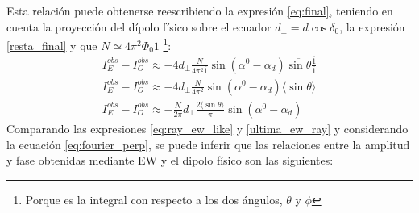 Esta relación puede obtenerse reescribiendo la expresión \ref{eq:final}, teniendo en cuenta la proyección del dípolo físico sobre el ecuador $d_{\perp}= d\cos\delta_0$, la expresión  \ref{resta_final} y que $N \simeq 4\pi^2 \Phi_0 \overline{1} $ \footnote{Porque es la integral con respecto a los dos ángulos, $\theta$ y $\phi$}:
\begin{align}
    I^{obs}_E -  I^{obs}_O \approx -4 d_\perp \frac{N}{ 4\pi^2\overline{1}} \sin(\alpha^0  - \alpha_d)\overline{\sin\theta} \frac{\overline{1}}{\overline{1}}\\
    I^{obs}_E -  I^{obs}_O \approx -4 d_\perp \frac{N}{ 4\pi^2} \sin(\alpha^0  - \alpha_d)\langle\sin\theta \rangle\\
    I^{obs}_E -  I^{obs}_O \approx -\frac{N}{2\pi} d_\perp \frac{2\langle\sin\theta \rangle }{\pi}\sin(\alpha^0  - \alpha_d) \label{ultima_ew_ray}
\end{align}
Comparando las expresiones \ref{eq:ray_ew_like} y \ref{ultima_ew_ray} y considerando la ecuación \ref{eq:fourier_perp}, se puede inferir que las relaciones entre la amplitud y fase obtenidas mediante EW y el dipolo físico son las siguientes:

